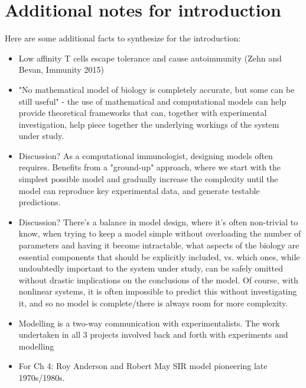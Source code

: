 \section*{Additional notes for introduction}

Here are some additional facts to synthesize for the introduction:

\begin{itemize}
    \item Low affinity T cells escape tolerance and cause autoimmunity (Zehn and Bevan, Immunity 2015)
    \item "No mathematical model of biology is completely accurate, but some can be still useful" - the use of mathematical and computational models can help provide theoretical frameworks that can, together with experimental investigation, help piece together the underlying workings of the system under study.
    \item Discussion? As a computational immunologist, designing models often requires. Benefits from a "ground-up" approach, where we start with the simplest possible model and gradually increase the complexity until the model can reproduce key experimental data, and generate testable predictions.
    \item Discussion? There's a balance in model design, where it's often non-trivial to know, when trying to keep a model simple without overloading the number of parameters and having it become intractable, what aspects of the biology are essential components that should be explicitly included, vs. which ones, while undoubtedly important to the system under study, can be safely omitted without drastic implications on the conclusions of the model. Of course, with nonlinear systems, it is often impossible to predict this without investigating it, and so no model is complete/there is always room for more complexity.
    \item Modelling is a two-way communication with experimentalists. The work undertaken in all 3 projects involved back and forth with experiments and modelling
    \item For Ch 4: Roy Anderson and Robert May SIR model pioneering late 1970s/1980s.
\end{itemize}